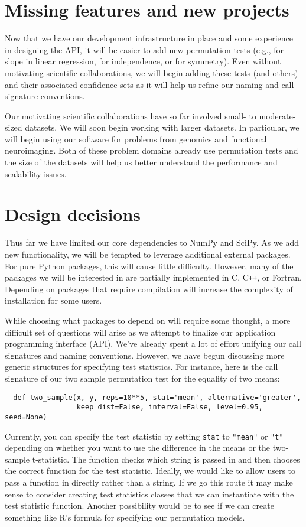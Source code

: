 \section{Missing features and new projects}

Now that we have our development infrastructure in place and some experience in
designing the API, it will be easier to add new permutation tests (e.g., for
slope in linear regression, for independence, or for symmetry).
Even without motivating scientific collaborations, we will begin adding these
tests (and others) and their associated confidence sets as it will help us
refine our naming and call signature conventions.

Our motivating scientific collaborations have so far involved small- to
moderate-sized datasets.  We will soon begin working with larger datasets.  In
particular, we will begin using our software for problems from genomics and
functional neuroimaging.  Both of these problem domains already use permutation
tests and the size of the datasets will help us better understand the
performance and scalability issues.

\section{Design decisions}

Thus far we have limited our core dependencies to NumPy and SciPy.
As we add new functionality, we will be tempted to leverage additional
external packages.  For pure Python packages, this will cause little
difficulty.  However, many of the packages we will be interested in
are partially implemented in C, C{}\verb!++!, or Fortran.  Depending
on packages that require compilation will increase the complexity
of installation for some users.

While choosing what packages to depend on will require some thought, a more
difficult set of questions will arise as we attempt to finalize our application
programming interface (API).  We've already spent a lot of effort unifying our
call signatures and naming conventions.  However, we have begun discussing more
generic structures for specifying test statistics.  For instance,
here is the call signature of our two sample permutation test for the equality
of two means: 
\begin{verbatim}
  def two_sample(x, y, reps=10**5, stat='mean', alternative='greater',
                 keep_dist=False, interval=False, level=0.95, seed=None)
\end{verbatim}
Currently, you can specify the test statistic by setting \texttt{stat} to
\texttt{"mean"} or \texttt{"t"} depending on whether you want to use the
difference in the means or the two-sample t-statistic.  The function checks
which string is passed in and then chooses the correct function for the test
statistic.  Ideally, we would like to allow users to pass a function in
directly rather than a string.  If we go this route it may make sense to
consider creating test statistics classes that we can instantiate with the test
statistic function.  Another possibility would be to see if we can create
something like R's formula for specifying our permutation models.


